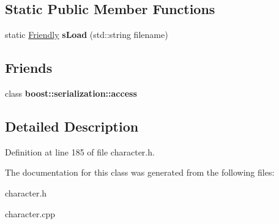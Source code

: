 \subsection*{Static Public Member Functions}
\begin{DoxyCompactItemize}
\item 
\hypertarget{class_friendly_aed039045cd15d26708634105abbea232}{}\label{class_friendly_aed039045cd15d26708634105abbea232} 
static \hyperlink{class_friendly}{Friendly} {\bfseries s\+Load} (std\+::string filename)
\end{DoxyCompactItemize}
\subsection*{Friends}
\begin{DoxyCompactItemize}
\item 
\hypertarget{class_friendly_ac98d07dd8f7b70e16ccb9a01abf56b9c}{}\label{class_friendly_ac98d07dd8f7b70e16ccb9a01abf56b9c} 
class {\bfseries boost\+::serialization\+::access}
\end{DoxyCompactItemize}


\subsection{Detailed Description}


Definition at line 185 of file character.\+h.



The documentation for this class was generated from the following files\+:\begin{DoxyCompactItemize}
\item 
character.\+h\item 
character.\+cpp\end{DoxyCompactItemize}
